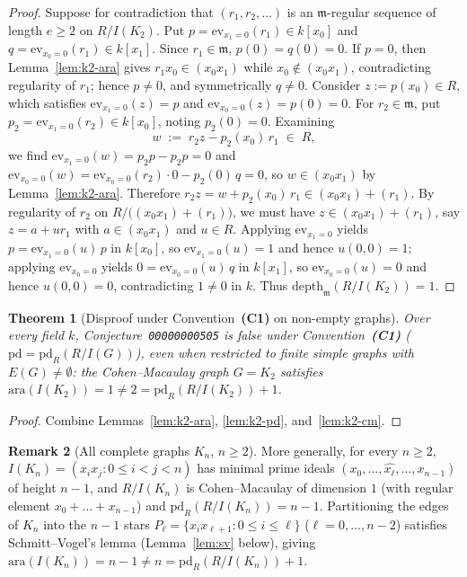 \documentclass[11pt,a4paper]{amsart}
\theoremstyle{plain}
\newtheorem{theorem}{Theorem}[section]
\theoremstyle{definition}
\newtheorem{remark}[theorem]{Remark}
\newcommand{\ara}{\mathrm{ara}}
\newcommand{\pd}{\mathrm{pd}}
\newcommand{\depth}{\mathrm{depth}}
\newcommand{\mm}{\mathfrak{m}}
\begin{document}
\begin{proof}
Suppose for contradiction that $(r_1, r_2, \dots)$ is an $\mm$-regular sequence of length $e \ge 2$ on $R/I(K_2)$. Put $p = \mathrm{ev}_{x_1=0}(r_1) \in k[x_0]$ and $q = \mathrm{ev}_{x_0=0}(r_1) \in k[x_1]$. Since $r_1 \in \mm$, $p(0) = q(0) = 0$. If $p = 0$, then Lemma~\ref{lem:k2-ara} gives $r_1 x_0 \in (x_0 x_1)$ while $x_0 \notin (x_0 x_1)$, contradicting regularity of $r_1$; hence $p \neq 0$, and symmetrically $q \neq 0$. Consider $z := p(x_0) \in R$, which satisfies $\mathrm{ev}_{x_1=0}(z) = p$ and $\mathrm{ev}_{x_0=0}(z) = p(0) = 0$. For $r_2 \in \mm$, put $p_2 = \mathrm{ev}_{x_1=0}(r_2) \in k[x_0]$, noting $p_2(0) = 0$. Examining
\[
  w \;:=\; r_2 z - p_2(x_0)\, r_1 \;\in\; R,
\]
we find $\mathrm{ev}_{x_1=0}(w) = p_2 p - p_2 p = 0$ and $\mathrm{ev}_{x_0=0}(w) = \mathrm{ev}_{x_0=0}(r_2)\cdot 0 - p_2(0)\,q = 0$, so $w \in (x_0 x_1)$ by Lemma~\ref{lem:k2-ara}. Therefore $r_2 z = w + p_2(x_0)\,r_1 \in (x_0 x_1) + (r_1)$. By regularity of $r_2$ on $R/\bigl((x_0 x_1) + (r_1)\bigr)$, we must have $z \in (x_0 x_1) + (r_1)$, say $z = a + u r_1$ with $a \in (x_0 x_1)$ and $u \in R$. Applying $\mathrm{ev}_{x_1=0}$ yields $p = \mathrm{ev}_{x_1=0}(u)\,p$ in $k[x_0]$, so $\mathrm{ev}_{x_1=0}(u) = 1$ and hence $u(0,0) = 1$; applying $\mathrm{ev}_{x_0=0}$ yields $0 = \mathrm{ev}_{x_0=0}(u)\,q$ in $k[x_1]$, so $\mathrm{ev}_{x_0=0}(u) = 0$ and hence $u(0,0) = 0$, contradicting $1 \neq 0$ in $k$. Thus $\depth_{\mm}(R/I(K_2)) = 1$.
\end{proof}

\begin{theorem}[Disproof under Convention~\textbf{(C1)} on non-empty graphs]\label{thm:c1-disproof}
Over every field $k$, Conjecture~\texttt{00000000505} is false under Convention~\textbf{(C1)} ($\pd = \pd_R(R/I(G))$), even when restricted to finite simple graphs with $E(G) \neq \emptyset$: the Cohen--Macaulay graph $G = K_2$ satisfies $\ara(I(K_2)) = 1 \neq 2 = \pd_R(R/I(K_2)) + 1$.
\end{theorem}

\begin{proof}
Combine Lemmas~\ref{lem:k2-ara}, \ref{lem:k2-pd}, and~\ref{lem:k2-cm}.
\end{proof}

\begin{remark}[All complete graphs $K_n$, $n \ge 2$]
More generally, for every $n \ge 2$, $I(K_n) = (x_i x_j : 0 \le i < j < n)$ has minimal prime ideals $(x_0,\dots,\widehat{x_\ell},\dots,x_{n-1})$ of height $n - 1$, and $R/I(K_n)$ is Cohen--Macaulay of dimension $1$ (with regular element $x_0 + \dots + x_{n-1}$) and $\pd_R(R/I(K_n)) = n - 1$. Partitioning the edges of $K_n$ into the $n - 1$ stars $P_\ell = \{x_i x_{\ell+1} : 0 \le i \le \ell\}$ ($\ell = 0,\dots,n-2$) satisfies Schmitt--Vogel's lemma (Lemma~\ref{lem:sv} below), giving $\ara(I(K_n)) = n - 1 \neq n = \pd_R(R/I(K_n)) + 1$.
\end{remark}
\end{document}
